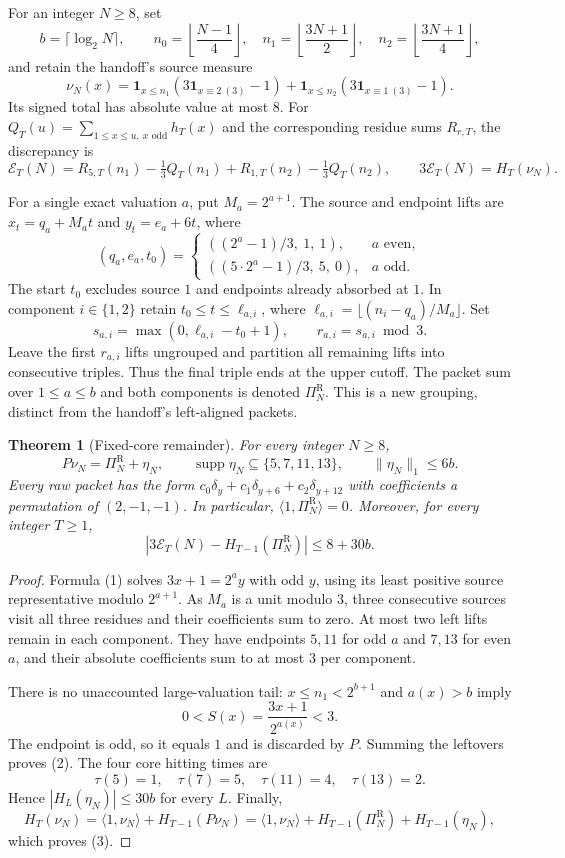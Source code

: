 \documentclass[11pt]{article}
\newtheorem{theorem}{Theorem}
\newcommand{\PiR}{\Pi^{\mathrm R}}
\newcommand{\supp}{\operatorname{supp}}
\begin{document}
For an integer $N\ge8$, set
\[
b=\lceil\log_2N\rceil,\qquad
n_0=\left\lfloor\frac{N-1}{4}\right\rfloor,\quad
n_1=\left\lfloor\frac{3N+1}{2}\right\rfloor,\quad
n_2=\left\lfloor\frac{3N+1}{4}\right\rfloor,
\]
and retain the handoff's source measure
\[
\nu_N(x)=\mathbf1_{x\le n_1}(3\mathbf1_{x\equiv2\ (3)}-1)
 +\mathbf1_{x\le n_2}(3\mathbf1_{x\equiv1\ (3)}-1).
\]
Its signed total has absolute value at most $8$. For
$Q_T(u)=\sum_{1\le x\le u,\ x\text{ odd}}h_T(x)$ and the corresponding
residue sums $R_{r,T}$, the discrepancy is
\[
\mathcal E_T(N)=R_{5,T}(n_1)-\tfrac13Q_T(n_1)
 +R_{1,T}(n_2)-\tfrac13Q_T(n_2),\qquad
3\mathcal E_T(N)=H_T(\nu_N).
\]

For a single exact valuation $a$, put $M_a=2^{a+1}$. The source and endpoint
lifts are $x_t=q_a+M_at$ and $y_t=e_a+6t$, where
\[
(q_a,e_a,t_0)=
\begin{cases}
((2^a-1)/3,\ 1,\ 1),&a\text{ even},\\
((5\cdot2^a-1)/3,\ 5,\ 0),&a\text{ odd}.
\end{cases}                                                    \tag{1}
\]
The start $t_0$ excludes source $1$ and endpoints already absorbed at $1$.
In component $i\in\{1,2\}$ retain $t_0\le t\le\ell_{a,i}$, where
$\ell_{a,i}=\lfloor(n_i-q_a)/M_a\rfloor$. Set
\[
s_{a,i}=\max(0,\ell_{a,i}-t_0+1),\qquad r_{a,i}=s_{a,i}\bmod3.
\]
Leave the first $r_{a,i}$ lifts ungrouped and partition all remaining lifts
into consecutive triples. Thus the final triple ends at the upper cutoff.
The packet sum over $1\le a\le b$ and both components is denoted $\PiR_N$.
This is a new grouping, distinct from the handoff's left-aligned packets.

\begin{theorem}[Fixed-core remainder]
For every integer $N\ge8$,
\[
P\nu_N=\PiR_N+\eta_N,\qquad
\supp\eta_N\subseteq\{5,7,11,13\},\qquad
\|\eta_N\|_1\le6b.                                           \tag{2}
\]
Every raw packet has the form
$c_0\delta_y+c_1\delta_{y+6}+c_2\delta_{y+12}$ with coefficients a
permutation of $(2,-1,-1)$. In particular, $\langle1,\PiR_N\rangle=0$.
Moreover, for every integer $T\ge1$,
\[
\left|3\mathcal E_T(N)-H_{T-1}(\PiR_N)\right|\le8+30b.       \tag{3}
\]
\end{theorem}
\begin{proof}
Formula (1) solves $3x+1=2^ay$ with odd $y$, using its least positive source
representative modulo $2^{a+1}$. As $M_a$ is a unit modulo $3$, three
consecutive sources visit all three residues and their coefficients sum to
zero. At most two left lifts remain in each component. They have endpoints
$5,11$ for odd $a$ and $7,13$ for even $a$, and their absolute coefficients
sum to at most $3$ per component.

There is no unaccounted large-valuation tail: $x\le n_1<2^{b+1}$ and
$a(x)>b$ imply
\[
0<S(x)=\frac{3x+1}{2^{a(x)}}<3.
\]
The endpoint is odd, so it equals $1$ and is discarded by $P$. Summing the
leftovers proves (2). The four core hitting times are
\[
\tau(5)=1,\quad\tau(7)=5,\quad\tau(11)=4,\quad\tau(13)=2.
\]
Hence $|H_L(\eta_N)|\le30b$ for every $L$. Finally,
\[
H_T(\nu_N)=\langle1,\nu_N\rangle+H_{T-1}(P\nu_N)
=\langle1,\nu_N\rangle+H_{T-1}(\PiR_N)+H_{T-1}(\eta_N),
\]
which proves (3).
\end{proof}
\end{document}
